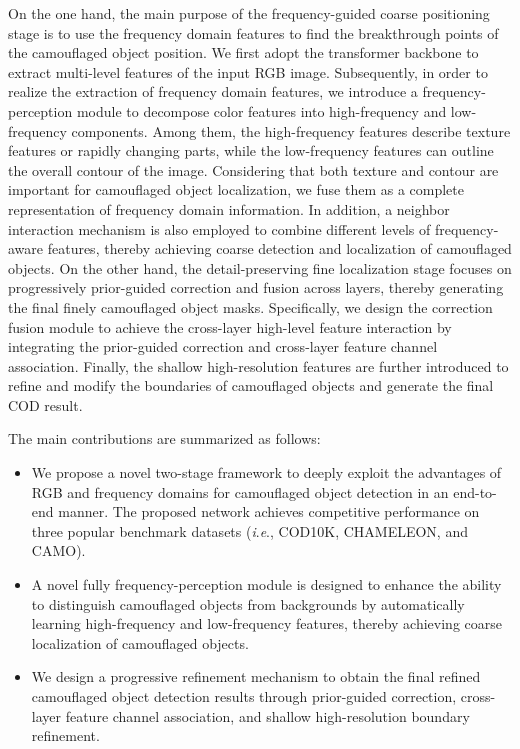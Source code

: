 \documentclass[sigconf,screen]{acmart}
\newcommand{\ie}{\textit{i}.\textit{e}.}
\begin{document}
On the one hand, the main purpose of the frequency-guided coarse positioning stage is to use the frequency domain features to find the breakthrough points of the camouflaged object position.
We first adopt the transformer backbone to extract multi-level features of the input RGB image. Subsequently, in order to realize the extraction of frequency domain features, we introduce a frequency-perception module to decompose color features into high-frequency and low-frequency components. Among them, the high-frequency features describe texture features or rapidly changing parts, while the low-frequency features can outline the overall contour of the image. Considering that both texture and contour are important for camouflaged object localization, we fuse them as a complete representation of frequency domain information. In addition, a neighbor interaction mechanism is also employed to combine different levels of frequency-aware features, thereby achieving coarse detection and localization of camouflaged objects.
On the other hand, the detail-preserving fine localization stage focuses on progressively prior-guided correction and fusion across layers, thereby generating the final finely camouflaged object masks. Specifically, we design the correction fusion module to achieve the cross-layer high-level feature interaction by integrating the prior-guided correction and cross-layer feature channel association.
Finally, the shallow high-resolution features are further introduced to refine and modify the boundaries of camouflaged objects and generate the final COD result.


The main contributions are summarized as follows:
\begin{itemize}
    \item We propose a novel two-stage framework to deeply exploit the advantages of RGB and frequency domains for camouflaged object detection in an end-to-end manner. The proposed network achieves competitive performance on three popular benchmark datasets (\ie, COD10K, CHAMELEON, and CAMO).
\end{itemize}
\begin{itemize}
    \item A novel fully frequency-perception module is designed to enhance the ability to distinguish camouflaged objects from backgrounds by automatically learning high-frequency and low-frequency features, thereby achieving coarse localization of camouflaged objects.
\end{itemize}
\begin{itemize}
    \item We design a progressive refinement mechanism to obtain the final refined camouflaged object detection results through prior-guided correction, cross-layer feature channel association, and shallow high-resolution boundary refinement.
\end{itemize}
\end{document}

